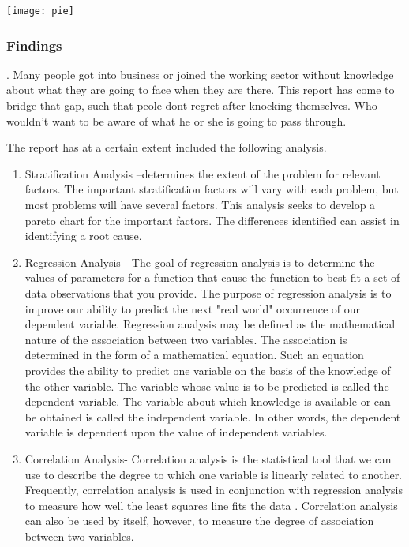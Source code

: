 \documentclass{article}
\begin{document}
\texttt{[image: pie]} 


\subsubsection{Findings}.
Many people got into business or joined the working sector without knowledge about what they are going to face when they are  there. This report has come to bridge that gap, such that peole dont regret after knocking themselves. Who wouldn't want to be aware of what he or she is going to pass through.

The report has at a certain extent included the following analysis. 
\begin{enumerate}

\item Stratification Analysis –determines the extent of the problem for relevant factors.  The important stratification factors will vary with each problem, but most problems will have several factors.  This analysis seeks to develop a pareto chart for the important factors. The differences identified can assist in identifying a root cause.

\item Regression Analysis - The goal of regression analysis is to determine the values of parameters for a function that cause the function to best fit a set of data observations that you provide. The purpose of regression analysis is to improve our ability to predict the next "real world" occurrence of our dependent variable. Regression analysis may be defined as the mathematical nature of the association between two variables. The association is determined in the form of a mathematical equation. Such an equation provides the ability to predict one variable on the basis of the knowledge of the other variable. The variable whose value is to be predicted is called the dependent variable. The variable about which knowledge is available or can be obtained is called the independent variable. In other words, the dependent variable is dependent upon the value of independent variables.

\item Correlation Analysis- Correlation analysis is the statistical tool that we can use to describe the degree to which one variable is linearly related to another. Frequently, correlation analysis is used in conjunction with regression  analysis to measure how well the least squares line fits the data . Correlation analysis can also be used by itself, however, to measure the degree of association between two variables. 
\end {enumerate}
\end{document}
